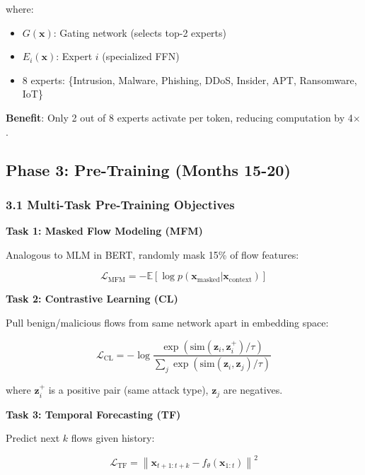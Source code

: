 \documentclass[11pt]{article}
\begin{document}
where:
\begin{itemize}
    \item $G(\mathbf{x})$: Gating network (selects top-2 experts)
    \item $E_i(\mathbf{x})$: Expert $i$ (specialized FFN)
    \item 8 experts: \{Intrusion, Malware, Phishing, DDoS, Insider, APT, Ransomware, IoT\}
\end{itemize}

\textbf{Benefit}: Only 2 out of 8 experts activate per token, reducing computation by 4$\times$.

\subsection{Phase 3: Pre-Training (Months 15-20)}

\subsubsection{3.1 Multi-Task Pre-Training Objectives}

\textbf{Task 1: Masked Flow Modeling (MFM)}

Analogous to MLM in BERT, randomly mask 15\% of flow features:

\begin{equation}
\mathcal{L}_{\text{MFM}} = -\mathbb{E} \left[\log p(\mathbf{x}_{\text{masked}} | \mathbf{x}_{\text{context}})\right]
\end{equation}

\textbf{Task 2: Contrastive Learning (CL)}

Pull benign/malicious flows from same network apart in embedding space:

\begin{equation}
\mathcal{L}_{\text{CL}} = -\log \frac{\exp(\text{sim}(\mathbf{z}_i, \mathbf{z}_i^+) / \tau)}{\sum_j \exp(\text{sim}(\mathbf{z}_i, \mathbf{z}_j) / \tau)}
\end{equation}

where $\mathbf{z}_i^+$ is a positive pair (same attack type), $\mathbf{z}_j$ are negatives.

\textbf{Task 3: Temporal Forecasting (TF)}

Predict next $k$ flows given history:

\begin{equation}
\mathcal{L}_{\text{TF}} = \left\| \mathbf{x}_{t+1:t+k} - f_\theta(\mathbf{x}_{1:t}) \right\|^2
\end{equation}
\end{document}
